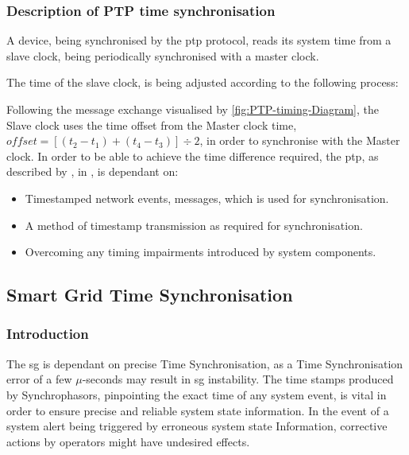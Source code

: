 \subsubsection{Description of PTP time synchronisation}



A device, being synchronised  by the \acrshort{ptp} protocol, reads its system time from a slave clock, being periodically synchronised with a master clock.


The time of the slave clock, is being adjusted according to the following process:


Following the message exchange visualised by \figureautorefname { } \ref{fig:PTP-timing-Diagram}, the Slave clock  uses the time offset from the Master clock time, $offset = [(t_2 - t_1) + (t_4 - t_3)]\div 2$, in order to synchronise with the Master clock. 
In order to be able to achieve the time difference required, the \acrshort{ptp}, as described by  \citeauthor{Eidson2006}, in \cite{Eidson2006}, is dependant on:

\begin{itemize}
    \item Timestamped network events, messages, which is  used for synchronisation.
    \item A method of timestamp transmission as required for synchronisation.
    \item Overcoming any timing impairments introduced by system components.
\end{itemize}




\subsection{Smart Grid Time Synchronisation}



\subsubsection{Introduction}


The \acrlong{sg} is dependant on precise Time Synchronisation, as a Time Synchronisation error of a few $\mu$-seconds may result in \acrshort{sg} instability. The time stamps produced by Synchrophasors, pinpointing the exact time of any system event, is vital in order to ensure precise and reliable system state information.
In the event of a system alert being triggered by erroneous system state Information, corrective actions by operators might have undesired effects. 

